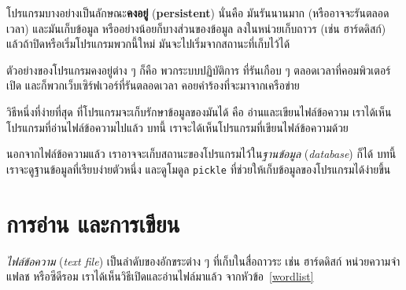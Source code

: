 โปรแกรมบางอย่างเป็นลักษณะ\textbf{คงอยู่} (\textbf{persistent})
นั่นคือ มันรันนานมาก (หรืออาจจะรันตลอดเวลา)
และมันเก็บข้อมูล หรืออย่างน้อยก็บางส่วนของข้อมูล ลงในหน่วยเก็บถาวร (เช่น ฮาร์ดดิสก์)
แล้วถ้าปิดหรือเริ่มโปรแกรมพวกนี้ใหม่
มันจะไปเริ่มจากสถานะที่เก็บไว้ได้


ตัวอย่างของโปรแกรมคงอยู่ต่าง ๆ ก็คือ พวกระบบปฏิบัติการ
ที่รันเกือบ ๆ ตลอดเวลาที่คอมพิวเตอร์เปิด
และก็พวกเว็บเซิร์ฟเวอร์ที่รันตลอดเวลา คอยคำร้องที่จะมาจากเครือข่าย


วิธีหนึ่งที่ง่ายที่สุด ที่โปรแกรมจะเก็บรักษาข้อมูลของมันได้ คือ อ่านและเขียนไฟล์ข้อความ
เราได้เห็นโปรแกรมที่อ่านไฟล์ข้อความไปแล้ว
บทนี้ เราจะได้เห็นโปรแกรมที่เขียนไฟล์ข้อความด้วย


นอกจากไฟล์ข้อความแล้ว เราอาจจะเก็บสถานะของโปรแกรมไว้ใน\textit{ฐานข้อมูล} (\textit{database}) ก็ได้
บทนี้ เราจะดูฐานข้อมูลที่เรียบง่ายตัวหนึ่ง และดูโมดูล \texttt{pickle}
ที่ช่วยให้เก็บข้อมูลของโปรแกรมได้ง่ายขึ้น

\section{การอ่าน และการเขียน}



\textit{ไฟล์ข้อความ} (\textit{text file})
เป็นลำดับของอักขระต่าง ๆ ที่เก็บในสื่อถาวระ เช่น ฮาร์ดดิสก์ หน่วยความจำแฟลช หรือซีดีรอม
เราได้เห็นวิธีเปิดและอ่านไฟล์มาแล้ว จากหัวข้อ~\ref{wordlist}

